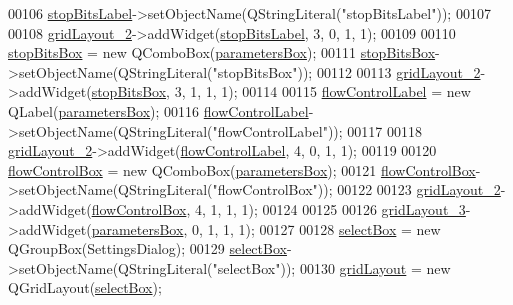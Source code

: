 \begin{DoxyCode}
00106         \hyperlink{a00029_a665748b39dda24475690e2363b72e265}{stopBitsLabel}->setObjectName(QStringLiteral(\textcolor{stringliteral}{"stopBitsLabel"}));
00107 
00108         \hyperlink{a00029_a7b71d6038a34f600625f007630c5234e}{gridLayout\_2}->addWidget(\hyperlink{a00029_a665748b39dda24475690e2363b72e265}{stopBitsLabel}, 3, 0, 1, 1);
00109 
00110         \hyperlink{a00029_ad61890c5fd0acc9e72385efd02df90c0}{stopBitsBox} = \textcolor{keyword}{new} QComboBox(\hyperlink{a00029_a47cebbe70a990bd1f309250101022889}{parametersBox});
00111         \hyperlink{a00029_ad61890c5fd0acc9e72385efd02df90c0}{stopBitsBox}->setObjectName(QStringLiteral(\textcolor{stringliteral}{"stopBitsBox"}));
00112 
00113         \hyperlink{a00029_a7b71d6038a34f600625f007630c5234e}{gridLayout\_2}->addWidget(\hyperlink{a00029_ad61890c5fd0acc9e72385efd02df90c0}{stopBitsBox}, 3, 1, 1, 1);
00114 
00115         \hyperlink{a00029_a7876a6baf43bd21d3b816f6a5a24fffc}{flowControlLabel} = \textcolor{keyword}{new} QLabel(\hyperlink{a00029_a47cebbe70a990bd1f309250101022889}{parametersBox});
00116         \hyperlink{a00029_a7876a6baf43bd21d3b816f6a5a24fffc}{flowControlLabel}->setObjectName(QStringLiteral(\textcolor{stringliteral}{"flowControlLabel"}));
00117 
00118         \hyperlink{a00029_a7b71d6038a34f600625f007630c5234e}{gridLayout\_2}->addWidget(\hyperlink{a00029_a7876a6baf43bd21d3b816f6a5a24fffc}{flowControlLabel}, 4, 0, 1, 1);
00119 
00120         \hyperlink{a00029_a1ebdf5da704108eae1078cefc446fbef}{flowControlBox} = \textcolor{keyword}{new} QComboBox(\hyperlink{a00029_a47cebbe70a990bd1f309250101022889}{parametersBox});
00121         \hyperlink{a00029_a1ebdf5da704108eae1078cefc446fbef}{flowControlBox}->setObjectName(QStringLiteral(\textcolor{stringliteral}{"flowControlBox"}));
00122 
00123         \hyperlink{a00029_a7b71d6038a34f600625f007630c5234e}{gridLayout\_2}->addWidget(\hyperlink{a00029_a1ebdf5da704108eae1078cefc446fbef}{flowControlBox}, 4, 1, 1, 1);
00124 
00125 
00126         \hyperlink{a00029_a2cc53955b73f22f0cfcf508da4654b16}{gridLayout\_3}->addWidget(\hyperlink{a00029_a47cebbe70a990bd1f309250101022889}{parametersBox}, 0, 1, 1, 1);
00127 
00128         \hyperlink{a00029_aea3871481f7ecb94f1835e519631f9a2}{selectBox} = \textcolor{keyword}{new} QGroupBox(SettingsDialog);
00129         \hyperlink{a00029_aea3871481f7ecb94f1835e519631f9a2}{selectBox}->setObjectName(QStringLiteral(\textcolor{stringliteral}{"selectBox"}));
00130         \hyperlink{a00029_a07d152c7cc63e2cffdda613baea54c0f}{gridLayout} = \textcolor{keyword}{new} QGridLayout(\hyperlink{a00029_aea3871481f7ecb94f1835e519631f9a2}{selectBox});

\end{DoxyCode}
